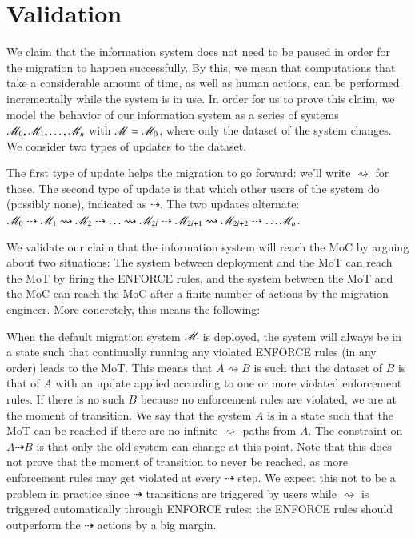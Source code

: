 \documentclass{elsarticle}
\begin{document}
\section{Validation}
   We claim that the information system does not need to be paused in order for the migration to happen successfully.
   By this, we mean that computations that take a considerable amount of time, as well as human actions, can be performed incrementally while the system is in use.
   In order for us to prove this claim, we model the behavior of our information system as a series of systems $\mathscr{M}_0,\mathscr{M}_1,\ldots,\mathscr{M}_n$ with $\mathscr{M} = \mathscr{M}_0$, where only the dataset of the system changes.
   We consider two types of updates to the dataset.
   
   The first type of update helps the migration to go forward: we'll write $\rightsquigarrow$ for those.
   The second type of update is that which other users of the system do (possibly none), indicated as $\dashrightarrow$.
   The two updates alternate: $\mathscr{M}_0 \dashrightarrow \mathscr{M}_1 \rightsquigarrow \mathscr{M}_2 \dashrightarrow \ldots \rightsquigarrow \mathscr{M}_{2i} \dashrightarrow \mathscr{M}_{2i+1}\rightsquigarrow\mathscr{M}_{2i+2}\dashrightarrow\ldots\mathscr{M}_n$.
   
   We validate our claim that the information system will reach the MoC by arguing about two situations:
   The system between deployment and the MoT can reach the MoT by firing the ENFORCE rules, and the system between the MoT and the MoC can reach the MoC after a finite number of actions by the migration engineer.
   More concretely, this means the following:
   
When the default migration system $\mathscr{M}$ is deployed, the system will always be in a state such that continually running any violated ENFORCE rules (in any order) leads to the MoT.
   This means that $A\rightsquigarrow B$ is such that the dataset of $B$ is that of $A$ with an update applied according to one or more violated enforcement rules. %
   If there is no such $B$ because no enforcement rules are violated, we are at the moment of transition.
   We say that the system $A$ is in a state such that the MoT can be reached if there are no infinite $\rightsquigarrow$-paths from $A$.
   The constraint on $A\dashrightarrow B$ is that only the old system can change at this point.
   Note that this does not prove that the moment of transition to never be reached, as more enforcement rules may get violated at every $\dashrightarrow$ step.
   We expect this not to be a problem in practice since $\dashrightarrow$ transitions are triggered by users while $\rightsquigarrow$ is triggered automatically through ENFORCE rules: the ENFORCE rules should outperform the $\dashrightarrow$ actions by a big margin.
\end{document}
